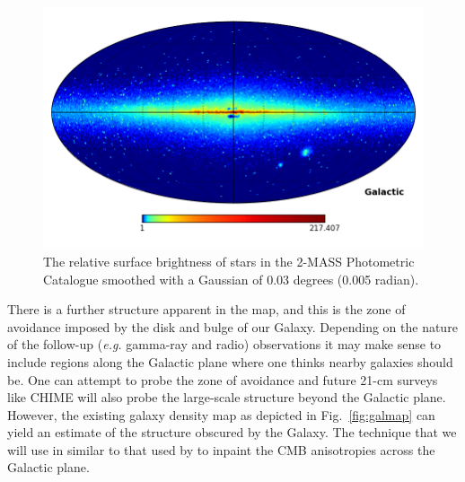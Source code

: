 \documentclass[useAMS,usenatbib]{mn2e}
\begin{document}
\begin{figure}
  \includegraphics[width=\columnwidth]{2mass_density}
  \caption{The relative surface brightness of stars in the 2-MASS
    Photometric Catalogue \citep{2006AJ....131.1163S} smoothed with a Gaussian
    of 0.03 degrees (0.005 radian).}
  \label{fig:starmap}
\end{figure}
There is a further structure apparent in the map, and this is the zone
of avoidance imposed by the disk and bulge of our Galaxy. Depending on
the nature of the follow-up ({\em e.g.} gamma-ray and radio)
observations it may make sense to include regions along the Galactic
plane where one thinks nearby galaxies should be. One can attempt to
probe the zone of avoidance \citep[e.g][]{2000AJ....120..298J} and
future 21-cm surveys like CHIME \citep{2014era..conf10102V} will also
probe the large-scale structure beyond the Galactic plane.  However,
the existing galaxy density map as depicted in Fig.~\ref{fig:galmap}
can yield an estimate of the structure obscured by the Galaxy.  The
technique that we will use in similar to that used by
\citet{2008StMet...5..289A} to inpaint the CMB anisotropies across the
Galactic plane.
\end{document}
